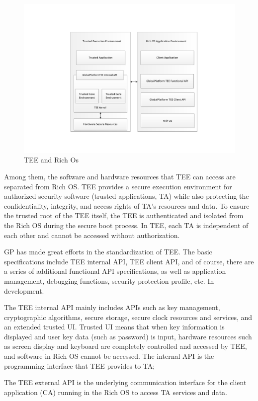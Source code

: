 \documentclass[journal]{IEEEtran}
\begin{document}
\begin{figure}[htbp]
\centerline{\includegraphics[scale=0.45]{TEE.pdf}}
\caption{TEE and Rich Os}
\label{fig}
\end{figure}

Among them, the software and hardware resources that TEE can access are separated from Rich OS. TEE provides a secure execution environment for authorized security software (trusted applications, TA) while also protecting the confidentiality, integrity, and access rights of TA's resources and data. To ensure the trusted root of the TEE itself, the TEE is authenticated and isolated from the Rich OS during the secure boot process. In TEE, each TA is independent of each other and cannot be accessed without authorization.

GP has made great efforts in the standardization of TEE. The basic specifications include TEE internal API, TEE client API, and of course, there are a series of additional functional API specifications, as well as application management, debugging functions, security protection profile, etc. In development.

The TEE internal API mainly includes APIs such as key management, cryptographic algorithms, secure storage, secure clock resources and services, and an extended trusted UI. Trusted UI means that when key information is displayed and user key data (such as password) is input, hardware resources such as screen display and keyboard are completely controlled and accessed by TEE, and software in Rich OS cannot be accessed. The internal API is the programming interface that TEE provides to TA;

The TEE external API is the underlying communication interface for the client application (CA) running in the Rich OS to access TA services and data.
\end{document}
